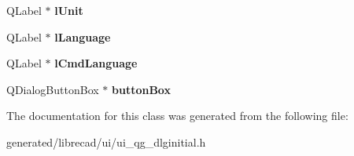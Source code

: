 \begin{DoxyCompactItemize}
\item 
\hypertarget{classUi__QG__DlgInitial_a9ac66fcba6d43c33a3ce854451652b14}{Q\-Label $\ast$ {\bfseries l\-Unit}}\label{classUi__QG__DlgInitial_a9ac66fcba6d43c33a3ce854451652b14}

\item 
\hypertarget{classUi__QG__DlgInitial_a87d1c7a8ec6a067a4d2f4566b8dc536c}{Q\-Label $\ast$ {\bfseries l\-Language}}\label{classUi__QG__DlgInitial_a87d1c7a8ec6a067a4d2f4566b8dc536c}

\item 
\hypertarget{classUi__QG__DlgInitial_abe0b74a36dd62a35a4a24898051eb8fd}{Q\-Label $\ast$ {\bfseries l\-Cmd\-Language}}\label{classUi__QG__DlgInitial_abe0b74a36dd62a35a4a24898051eb8fd}

\item 
\hypertarget{classUi__QG__DlgInitial_ad57d252b9455e2b7d34677cf17d37743}{Q\-Dialog\-Button\-Box $\ast$ {\bfseries button\-Box}}\label{classUi__QG__DlgInitial_ad57d252b9455e2b7d34677cf17d37743}

\end{DoxyCompactItemize}


The documentation for this class was generated from the following file\-:\begin{DoxyCompactItemize}
\item 
generated/librecad/ui/ui\-\_\-qg\-\_\-dlginitial.\-h\end{DoxyCompactItemize}
